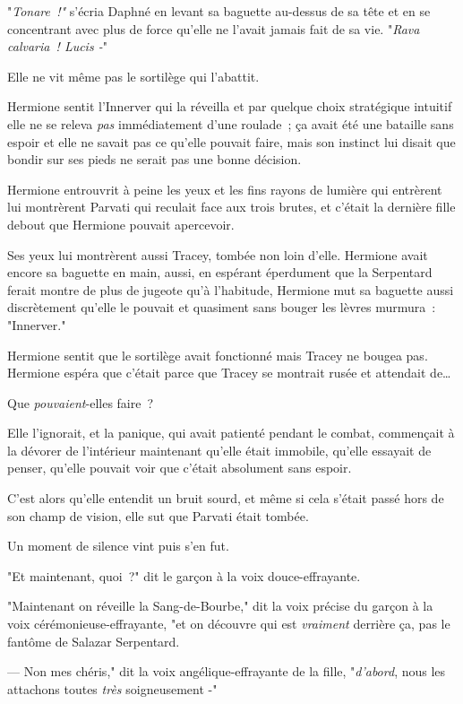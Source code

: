 "\emph{Tonare~!"} s'écria Daphné en levant sa baguette au-dessus de sa tête et en se concentrant avec plus de force qu'elle ne l'avait jamais fait de sa vie. "\emph{Rava calvaria~! Lucis -}"

Elle ne vit même pas le sortilège qui l'abattit.

\later

Hermione sentit l'Innerver qui la réveilla et par quelque choix stratégique intuitif elle ne se releva \emph{pas} immédiatement d'une roulade~; ça avait été une bataille sans espoir et elle ne savait pas ce qu'elle pouvait faire, mais son instinct lui disait que bondir sur ses pieds ne serait pas une bonne décision.

Hermione entrouvrit à peine les yeux et les fins rayons de lumière qui entrèrent lui montrèrent Parvati qui reculait face aux trois brutes, et c'était la dernière fille debout que Hermione pouvait apercevoir.

Ses yeux lui montrèrent aussi Tracey, tombée non loin d'elle. Hermione avait encore sa baguette en main, aussi, en espérant éperdument que la Serpentard ferait montre de plus de jugeote qu'à l'habitude, Hermione mut sa baguette aussi discrètement qu'elle le pouvait et quasiment sans bouger les lèvres murmura~: "Innerver."

Hermione sentit que le sortilège avait fonctionné mais Tracey ne bougea pas. Hermione espéra que c'était parce que Tracey se montrait rusée et attendait de…

Que \emph{pouvaient}-elles faire~?

Elle l'ignorait, et la panique, qui avait patienté pendant le combat, commençait à la dévorer de l'intérieur maintenant qu'elle était immobile, qu'elle essayait de penser, qu'elle pouvait voir que c'était absolument sans espoir.

C'est alors qu'elle entendit un bruit sourd, et même si cela s'était passé hors de son champ de vision, elle sut que Parvati était tombée.

Un moment de silence vint puis s'en fut.

"Et maintenant, quoi~?" dit le garçon à la voix douce-effrayante.

"Maintenant on réveille la Sang-de-Bourbe," dit la voix précise du garçon à la voix cérémonieuse-effrayante, "et on découvre qui est \emph{vraiment} derrière ça, pas le fantôme de Salazar Serpentard.

--- Non mes chéris," dit la voix angélique-effrayante de la fille, "\emph{d'abord}, nous les attachons toutes \emph{très} soigneusement -"

